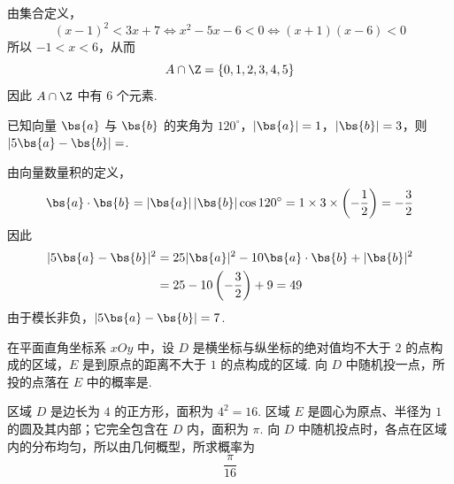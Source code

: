
\begin{solution}
由集合定义，
\[
(x-1)^2<3x+7
\Longleftrightarrow x^2-5x-6<0
\Longleftrightarrow (x+1)(x-6)<0
\]
所以 \(-1<x<6\)，从而
\[
A\cap\Z=\{0,1,2,3,4,5\}
\]
因此 \(A\cap\Z\) 中有 \(6\) 个元素.
\end{solution}

\begin{problem}
已知向量 \(\bs{a}\) 与 \(\bs{b}\) 的夹角为 \(120^{\circ}\)，\(|\bs{a}| = 1\)，\(|\bs{b}| = 3\)，则 \(|5\bs{a} - \bs{b}| = \)\fillinblank{}.
\end{problem}


\begin{solution}
由向量数量积的定义，
\[
\bs{a}\cdot\bs{b}=|\bs{a}|\,|\bs{b}|\cos120^{\circ}=1\times3\times\left(-\frac12\right)=-\frac32
\]
因此
\[
\begin{aligned}
|5\bs{a}-\bs{b}|^2
&=25|\bs{a}|^2-10\bs{a}\cdot\bs{b}+|\bs{b}|^2\\
&=25-10\left(-\frac32\right)+9=49
\end{aligned}
\]
由于模长非负，\(|5\bs{a}-\bs{b}|=7\).
\end{solution}

\begin{problem}
在平面直角坐标系 \(xOy\) 中，设 \(D\) 是横坐标与纵坐标的绝对值均不大于 \(2\) 的点构成的区域，\(E\) 是到原点的距离不大于 \(1\) 的点构成的区域. 向 \(D\) 中随机投一点，所投的点落在 \(E\) 中的概率是\fillinblank{}.
\end{problem}


\begin{solution}
区域 \(D\) 是边长为 \(4\) 的正方形，面积为 \(4^2=16\). 区域 \(E\) 是圆心为原点、半径为 \(1\) 的圆及其内部；它完全包含在 \(D\) 内，面积为 \(\pi\). 向 \(D\) 中随机投点时，各点在区域内的分布均匀，所以由几何概型，所求概率为
\[
\frac{\pi}{16}
\]
\end{solution}

